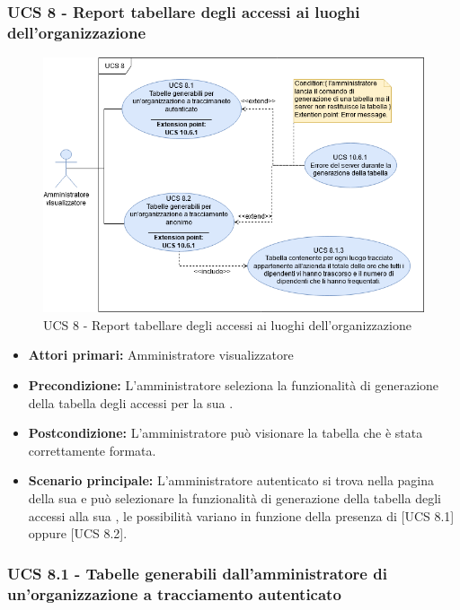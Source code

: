 \newpage
\subsubsection{UCS 8 - Report tabellare degli accessi ai luoghi dell'organizzazione}%
\begin{figure}[h!]
	\centering
    \includegraphics[scale=0.53]{Sezioni/UseCase/Immagini/UCS8.png}
    \caption{UCS 8 - Report tabellare degli accessi ai luoghi dell'organizzazione}
\end{figure}

\begin{itemize}
\item \textbf{Attori primari:} Amministratore visualizzatore
\item \textbf{Precondizione:} L'amministratore seleziona la funzionalità di generazione della tabella degli accessi per la sua .
\item \textbf{Postcondizione:} L'amministratore può visionare la tabella che è stata correttamente formata.
\item \textbf{Scenario principale:} L'amministratore autenticato si trova nella pagina della sua  e può selezionare la funzionalità di generazione della tabella degli accessi alla sua , le possibilità variano in funzione della presenza di  [UCS 8.1] oppure  [UCS 8.2].
\end{itemize}

\subsubsection{UCS 8.1 - Tabelle generabili dall'amministratore di un'organizzazione a tracciamento autenticato}%


